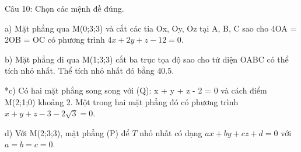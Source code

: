 \documentclass[a4paper,12pt]{article}
\begin{document}
Câu 10: Chọn các mệnh đề đúng.

a) Mặt phẳng qua M(0;3;3) và cắt các tia Ox, Oy, Oz tại A, B, C sao cho 4OA = 2OB = OC có phương trình \(4x + 2y + z - 12 = 0\).

b) Mặt phẳng đi qua M(1;3;3) cắt ba trục tọa độ sao cho tứ diện OABC có thể tích nhỏ nhất. Thể tích nhỏ nhất đó bằng \(40.5\).

*c) Có hai mặt phẳng song song với (Q): x + y + z - 2 = 0 và cách điểm M(2;1;0) khoảng 2. Một trong hai mặt phẳng đó có phương trình \(x + y + z - 3 - 2\sqrt{3} = 0\).

d) Với M(2;3;3), mặt phẳng (P) để \(T\) nhỏ nhất có dạng \(ax+by+cz+d=0\) với \(a=b=c=0\).
\end{document}
